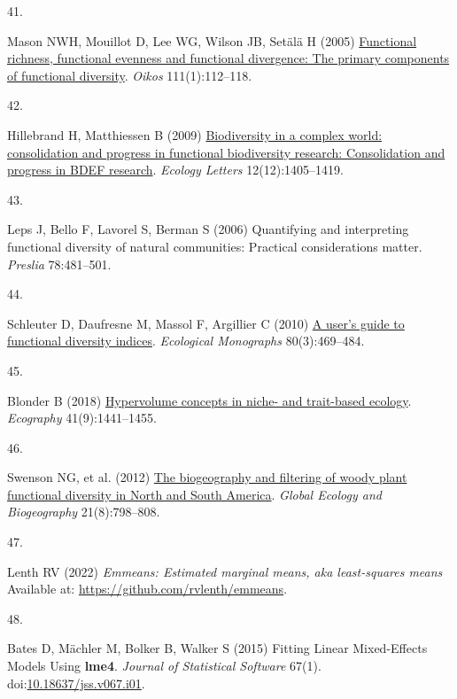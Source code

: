 \documentclass{article}
\newlength{\cslhangindent}
\newlength{\csllabelwidth}
\newlength{\cslentryspacingunit} %
\newenvironment{CSLReferences}[2] %
 {%
  \setlength{\parindent}{0pt}
  \ifodd #1
  \let\oldpar\par
  \def\par{\hangindent=\cslhangindent\oldpar}
  \fi
  \setlength{\parskip}{#2\cslentryspacingunit}
 }%
 {}
\newcommand{\CSLLeftMargin}[1]{\parbox[t]{\csllabelwidth}{#1}}
\newcommand{\CSLRightInline}[1]{\parbox[t]{\linewidth - \csllabelwidth}{#1}\break}
\begin{document}
\begin{CSLReferences}{0}{0}
\leavevmode{}%
\CSLLeftMargin{41. }%
\CSLRightInline{Mason NWH, Mouillot D, Lee WG, Wilson JB, Setälä H
(2005) \href{http://www.jstor.org/stable/3548774}{Functional richness,
functional evenness and functional divergence: The primary components of
functional diversity}. \emph{Oikos} 111(1):112--118.}

\leavevmode{}%
\CSLLeftMargin{42. }%
\CSLRightInline{Hillebrand H, Matthiessen B (2009)
\href{https://doi.org/10.1111/j.1461-0248.2009.01388.x}{Biodiversity in
a complex world: consolidation and progress in functional biodiversity
research: Consolidation and progress in BDEF research}. \emph{Ecology
Letters} 12(12):1405--1419.}

\leavevmode{}%
\CSLLeftMargin{43. }%
\CSLRightInline{Leps J, Bello F, Lavorel S, Berman S (2006) Quantifying
and interpreting functional diversity of natural communities: Practical
considerations matter. \emph{Preslia} 78:481--501.}

\leavevmode{}%
\CSLLeftMargin{44. }%
\CSLRightInline{Schleuter D, Daufresne M, Massol F, Argillier C (2010)
\href{https://doi.org/10.1890/08-2225.1}{A user's guide to functional
diversity indices}. \emph{Ecological Monographs} 80(3):469--484.}

\leavevmode{}%
\CSLLeftMargin{45. }%
\CSLRightInline{Blonder B (2018)
\href{https://doi.org/10.1111/ecog.03187}{Hypervolume concepts in niche-
and trait-based ecology}. \emph{Ecography} 41(9):1441--1455.}

\leavevmode{}%
\CSLLeftMargin{46. }%
\CSLRightInline{Swenson NG, et al. (2012)
\href{https://doi.org/10.1111/j.1466-8238.2011.00727.x}{The biogeography
and filtering of woody plant functional diversity in North and South
America}. \emph{Global Ecology and Biogeography} 21(8):798--808.}

\leavevmode{}%
\CSLLeftMargin{47. }%
\CSLRightInline{Lenth RV (2022) \emph{Emmeans: Estimated marginal means,
aka least-squares means} Available at:
\url{https://github.com/rvlenth/emmeans}.}

\leavevmode{}%
\CSLLeftMargin{48. }%
\CSLRightInline{Bates D, Mächler M, Bolker B, Walker S (2015) Fitting
Linear Mixed-Effects Models Using {\textbf{lme4}}. \emph{Journal of
Statistical Software} 67(1).
doi:\href{https://doi.org/10.18637/jss.v067.i01}{10.18637/jss.v067.i01}.}


\end{CSLReferences}
\end{document}
